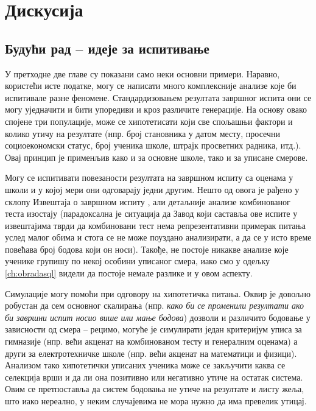 \chapter{Дискусија}\label{ch:\thechapter}

\section{Будући рад -- идеје за испитивање}

У претходне две главе су показани само неки основни примери. Наравно, користећи исте податке, могу се написати много комплексније анализе које би испитивале разне феномене. Стандардизовањем резултата завршног испита они се могу уједначити и бити упоредиви и кроз различите генерације. На основу овако спојене три популације, може се хипотетисати који све спољашњи фактори и колико утичу на резултате (нпр. број становника у датом месту, просечни социоекономски статус, број ученика школе, штрајк просветних радника, итд.). Овај принцип је применљив како и за основне школе, тако и за уписане смерове.

Могу се испитивати повезаности резултата на завршном испиту са оценама у школи и у којој мери они одговарају једни другим. Нешто од овога је рађено у склопу Извештаја о завршном испиту \citep{izvestaj15}\citep{izvestaj16}\citep{izvestaj17}, али детаљније анализе комбинованог теста изостају (парадоксална је ситуација да Завод који саставља ове испите у извештајима тврди да комбиновани тест нема репрезентативни примерак питања услед малог обима и стога се не може поуздано анализирати, а да се у исто време повећава број бодова који он носи). Такође, не постоје никакве анализе које ученике групишу по некој особини уписаног смера, иако смо у одељку \ref{ch:obradasql} видели да постоје немале разлике и у овом аспекту.

Симулације могу помоћи при одговору на хипотетичка питања. Оквир је довољно робустан да сем основног скалирања (нпр. \emph{како би се променили резултати ако би завршни испит носио више или мање бодова}) дозволи и различито бодовање у зависности од смера -- рецимо, могуће је симулирати један критеријум уписа за гимназије (нпр. већи акценат на комбинованом тесту и генералним оценама) а други за електротехничке школе (нпр. већи акценат на математици и физици). Анализом тако хипотетички уписаних ученика може се закључити каква се селекција врши и да ли она позитивно или негативно утиче на остатак система. Овим се претпоставља да систем бодовања не утиче на резултате и листу жеља, што иако нереално, у неким случајевима не мора нужно да има превелик утицај.

